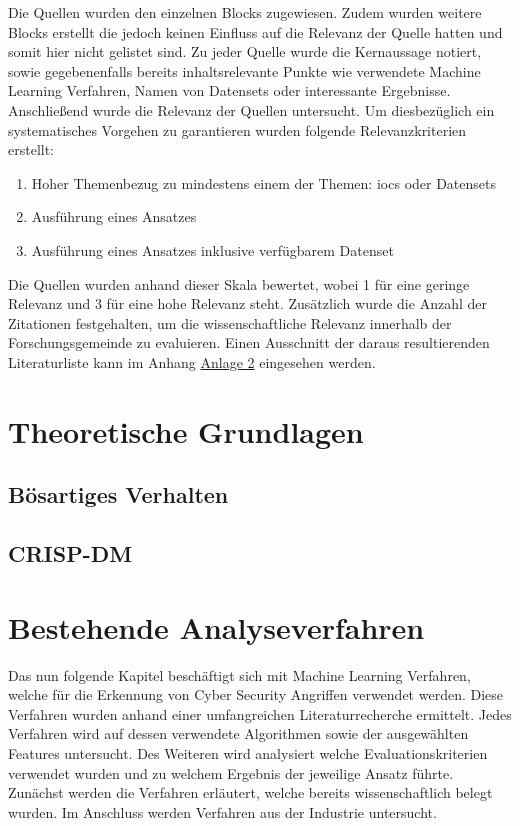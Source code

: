 \documentclass[
    12pt, %
    DIV10,
    ngerman, %
    a4paper, %
    oneside, %
    titlepage, %
    parskip=half, %
    headings=normal, %
    listof=totoc, %
    bibliography=totoc, %
    index=totoc, %
    captions=tableheading, %
    final %
]{scrreprt}
\begin{document}
Die Quellen wurden den einzelnen Blocks zugewiesen. Zudem wurden weitere Blocks erstellt die jedoch keinen Einfluss auf die Relevanz der Quelle hatten und somit hier nicht gelistet sind. Zu jeder Quelle wurde die Kernaussage notiert, sowie gegebenenfalls bereits inhaltsrelevante Punkte wie verwendete Machine Learning Verfahren, Namen von Datensets oder interessante Ergebnisse. Anschließend wurde die Relevanz der Quellen untersucht. 
Um diesbezüglich ein systematisches Vorgehen zu garantieren wurden folgende Relevanzkriterien erstellt:
\begin{enumerate}
\item Hoher Themenbezug zu mindestens einem der Themen: \ac{iocs} oder Datensets
\item Ausführung eines Ansatzes
\item Ausführung eines Ansatzes inklusive verfügbarem Datenset
\end{enumerate}
Die Quellen wurden anhand dieser Skala bewertet, wobei 1 für eine geringe Relevanz und 3 für eine hohe Relevanz steht.
Zusätzlich wurde die Anzahl der Zitationen festgehalten, um die wissenschaftliche Relevanz innerhalb der Forschungsgemeinde zu evaluieren. Einen Ausschnitt der daraus resultierenden Literaturliste kann im Anhang \hyperref[literaturr]{Anlage 2} eingesehen werden.
\chapter{Theoretische Grundlagen}\label{sec:tg}
\section{Bösartiges Verhalten}
\label{sec:ioc}
%
\section{CRISP-DM}
\label{sec:crisp}
%
\chapter{Bestehende Analyseverfahren}
\label{sec:ba}
Das nun folgende Kapitel beschäftigt sich mit Machine Learning Verfahren, welche für die Erkennung von Cyber Security Angriffen verwendet werden. Diese Verfahren wurden anhand einer umfangreichen Literaturrecherche ermittelt. Jedes Verfahren wird auf dessen verwendete Algorithmen sowie der ausgewählten Features untersucht. Des Weiteren wird analysiert welche Evaluationskriterien verwendet wurden und zu welchem Ergebnis der jeweilige Ansatz führte.\\
Zunächst werden die Verfahren erläutert, welche bereits wissenschaftlich belegt wurden. Im Anschluss werden Verfahren aus der Industrie untersucht.
% 
\end{document}
